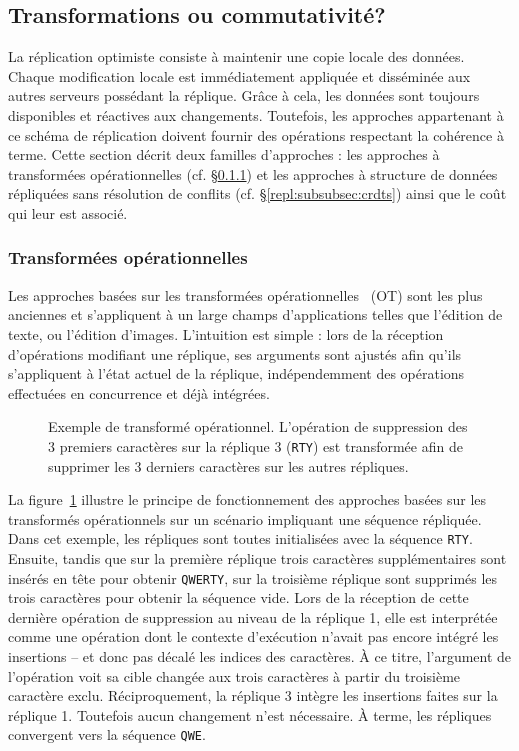 \subsection{Transformations ou commutativité?}
\label{repl:subsec:otorcrdts}

La réplication optimiste consiste à maintenir une copie locale des
données. Chaque modification locale est immédiatement appliquée et disséminée
aux autres serveurs possédant la réplique. Grâce à cela, les données sont
toujours disponibles et réactives aux changements. Toutefois, les approches
appartenant à ce schéma de réplication doivent fournir des opérations respectant
la cohérence à terme. Cette section décrit deux familles d'approches : les
approches à transformées opérationnelles (cf. §\ref{repl:subsubsec:ot}) et les
approches à structure de données répliquées sans résolution de conflits
(cf. §\ref{repl:subsubsec:crdts}) ainsi que le coût qui leur est associé.

\subsubsection{Transformées opérationnelles}
\label{repl:subsubsec:ot}

Les approches basées sur les transformées
opérationnelles~\cite{sun1998operational, sun2009contextbased} (OT) sont les
plus anciennes et s'appliquent à un large champs d'applications telles que
l'édition de texte, ou l'édition d'images. L'intuition est simple : lors de la
réception d'opérations modifiant une réplique, ses arguments sont ajustés afin
qu'ils s'appliquent à l'état actuel de la réplique, indépendemment des
opérations effectuées en concurrence et déjà intégrées.

\begin{figure}
  \centering
  
  \caption[Exemple de transformé opérationnel] {\label{repl:fig:otexample}
    Exemple de transformé opérationnel. L'opération de suppression des 3
    premiers caractères sur la réplique 3 (\texttt{RTY}) est transformée afin de
    supprimer les 3 derniers caractères sur les autres répliques.}
\end{figure}

La figure~\ref{repl:fig:otexample} illustre le principe de fonctionnement des
approches basées sur les transformés opérationnels sur un scénario impliquant
une séquence répliquée. Dans cet exemple, les répliques sont toutes initialisées
avec la séquence \texttt{RTY}. Ensuite, tandis que sur la première réplique
trois caractères supplémentaires sont insérés en tête pour obtenir
\texttt{QWERTY}, sur la troisième réplique sont supprimés les trois caractères
pour obtenir la séquence vide. Lors de la réception de cette dernière opération
de suppression au niveau de la réplique 1, elle est interprétée comme une
opération dont le contexte d'exécution n'avait pas encore intégré les insertions
-- et donc pas décalé les indices des caractères. À ce titre, l'argument de
l'opération voit sa cible changée aux trois caractères à partir du troisième
caractère exclu. Réciproquement, la réplique 3 intègre les insertions faites sur
la réplique 1. Toutefois aucun changement n'est nécessaire. À terme, les
répliques convergent vers la séquence \texttt{QWE}.

